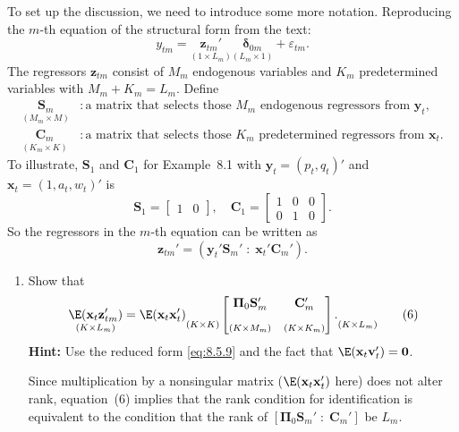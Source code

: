 \begin{problemset}
To set up the discussion, we need to introduce some more notation. Reproducing the $m$-th equation of the structural form from the text:
\[
  y_{tm} = \underset{(1 \times L_m)}{\mathbf{z}_{tm}'}
  \underset{(L_m \times 1)}{\boldsymbol{\delta}_{0m}}
  + \varepsilon_{tm}.
  \tag{5}
\]
The regressors $\mathbf{z}_{tm}$ consist of $M_m$ endogenous variables and $K_m$ predetermined
variables with $M_m + K_m = L_m$. Define
\begin{align*}
  \underset{(M_m \times M)}{\mathbf{S}_m}
  &: \text{a matrix that selects those $M_m$ endogenous regressors from $\mathbf{y}_t$}, \\
  \underset{(K_m \times K)}{\mathbf{C}_m}
  &: \text{a matrix that selects those $K_m$ predetermined regressors from $\mathbf{x}_t$}.
\end{align*}
To illustrate, $\mathbf{S}_1$ and $\mathbf{C}_1$ for Example~8.1 with
$\mathbf{y}_t = (p_t, q_t)'$ and $\mathbf{x}_t = (1, a_t, w_t)'$
is
\[
  \mathbf{S}_1 = \begin{bmatrix} 1 & 0 \end{bmatrix}, \quad
  \mathbf{C}_1 = \begin{bmatrix} 1 & 0 & 0 \\ 0 & 1 & 0 \end{bmatrix}.
\]
So the regressors in the $m$-th equation can be written as
\[
  \mathbf{z}_{tm}' = (\mathbf{y}_t'\mathbf{S}_m' \;:\; \mathbf{x}_t'\mathbf{C}_m').
\]

\begin{enumerate}[label=(\alph*)]
\item Show that
  \begin{equation}
    \underset{(K \times L_m)}{\E(\mathbf{x}_t\mathbf{z}_{tm}')}
    = \E(\mathbf{x}_t\mathbf{x}_t')
    \underset{(K \times K)}{\phantom{x}}
    \begin{bmatrix}
      \boldsymbol{\Pi}_0\mathbf{S}_m' & \mathbf{C}_m' \\
      \underset{(K \times M_m)}{\phantom{x}} & \underset{(K \times K_m)}{\phantom{x}}
    \end{bmatrix}.
    \underset{(K \times L_m)}{\phantom{x}}
    \tag{6}
  \end{equation}
  \textbf{Hint:} Use the reduced form \eqref{eq:8.5.9} and the fact that $\E(\mathbf{x}_t\mathbf{v}_t') = \mathbf{0}$.

  Since multiplication by a nonsingular matrix ($\E(\mathbf{x}_t\mathbf{x}_t')$ here) does not alter rank,
  equation~(6) implies that the rank condition for identification is equivalent to
  the condition that the rank of $[\boldsymbol{\Pi}_0\mathbf{S}_m' \;:\; \mathbf{C}_m']$ be $L_m$.


\end{enumerate}
\end{problemset}
